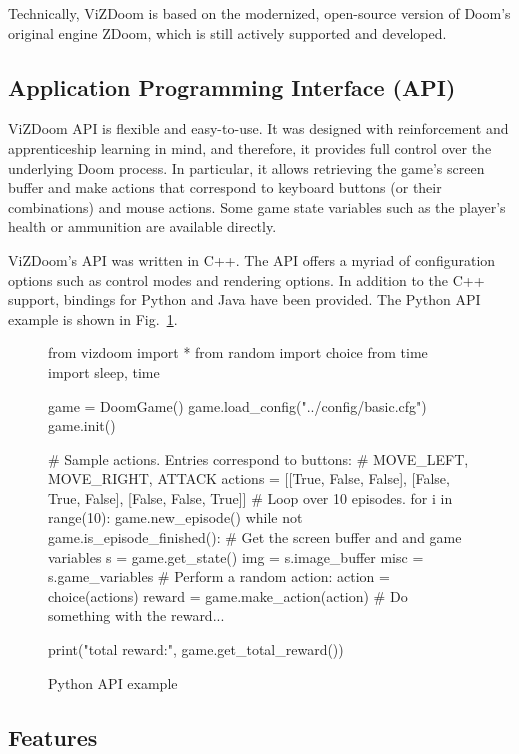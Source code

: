 \documentclass[english,american,conference, balance]{IEEEtran}
\begin{document}
Technically, ViZDoom is based on the modernized, open-source version
of Doom's original engine \textemdash{} ZDoom, which is still actively
supported and developed.

\subsection{Application Programming Interface (API)\label{subsec:api}}

ViZDoom API is flexible and easy-to-use. It was designed with reinforcement
and apprenticeship learning in mind, and therefore, it provides full
control over the underlying Doom process. In particular, it allows
retrieving the game's screen buffer and make actions that correspond
to keyboard buttons (or their combinations) and mouse actions. Some
game state variables such as the player's health or ammunition are
available directly. 

ViZDoom's API was written in C++. The API offers a myriad of configuration
options such as control modes and rendering options. In addition to
the C++ support, bindings for Python and Java have been provided.
The Python API example is shown in Fig.~\ref{fig:PythonExample}.

\begin{figure}
\begin{pblock}  
from vizdoom import *
from random import choice 
from time import sleep, time

game = DoomGame() 
game.load_config("../config/basic.cfg")  
game.init()

# Sample actions. Entries correspond to buttons:
# MOVE_LEFT, MOVE_RIGHT, ATTACK 
actions = [[True, False, False],            
			[False, True, False], [False, False, True]]
# Loop over 10 episodes.
for i in range(10): 	
	game.new_episode() 	
	while not game.is_episode_finished():  		
		# Get the screen buffer and and game variables 		
		s = game.get_state() 		
		img = s.image_buffer 		
		misc = s.game_variables 
		# Perform a random action: 		
		action = choice(actions) 		
		reward = game.make_action(action)
		# Do something with the reward...
	
	print("total reward:", game.get_total_reward()) 	
\end{pblock}\caption{\label{fig:PythonExample}Python API example}
\end{figure}


\subsection{Features}
\end{document}
